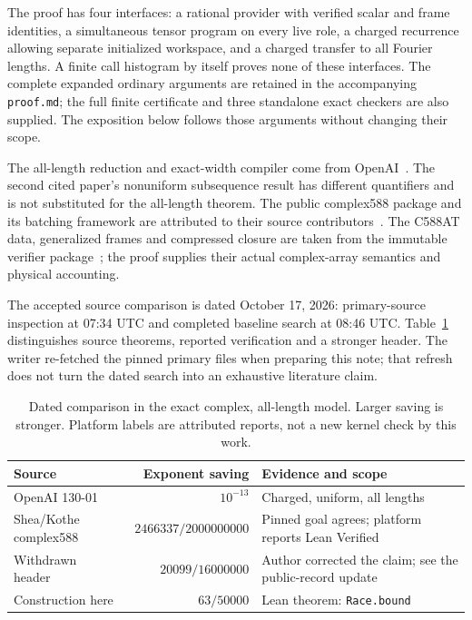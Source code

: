 \documentclass[11pt]{amsart}
\theoremstyle{remark}
\begin{document}
The proof has four interfaces: a rational provider with verified scalar
and frame identities, a simultaneous tensor program on every live role,
a charged recurrence allowing separate initialized workspace, and a
charged transfer to all Fourier lengths. A finite call histogram by
itself proves none of these interfaces. The complete expanded ordinary
arguments are retained in the accompanying \texttt{proof.md}; the full
finite certificate and three standalone exact checkers are also supplied.
The exposition below follows those arguments without changing their scope.

The all-length reduction and exact-width compiler come from
OpenAI~\cite{OpenAIExactDFT2026,OpenAIFiniteTensor2026}. The second cited
paper's nonuniform subsequence result has different quantifiers and is
not substituted for the all-length theorem. The public complex588
package and its batching framework are attributed to their source
contributors~\cite{SheaPackage2026}. The C588AT data, generalized frames
and compressed closure are taken from the immutable verifier
package~\cite{VerifierPackage2026}; the proof supplies their actual
complex-array semantics and physical accounting.

The accepted source comparison is dated October 17, 2026: primary-source
inspection at 07:34 UTC and completed baseline search at 08:46 UTC.
Table~\ref{tab:comparison} distinguishes source theorems, reported
verification and a stronger header. The writer re-fetched the pinned
primary files when preparing this note; that refresh does not turn the
dated search into an exhaustive literature claim.
\begin{table}[ht]
\centering\small
\begin{tabular}{p{}rp{}}
\toprule
Source & Exponent saving & Evidence and scope \\
\midrule
OpenAI 130-01~\cite{OpenAIExactDFT2026} & $10^{-13}$ & Charged, uniform, all lengths \\
Shea/Kothe complex588~\cite{SheaPackage2026} & $2466337/2000000000$ & Pinned goal agrees; platform reports Lean Verified \\
Withdrawn header~\cite{VerifierPackage2026} & $20099/16000000$ & Author corrected the claim; see the public-record update \\
Construction here & $63/50000$ & Lean theorem: \texttt{Race.bound} \\
\bottomrule
\end{tabular}
\caption{Dated comparison in the exact complex, all-length model. Larger
saving is stronger. Platform labels are attributed reports, not a new
kernel check by this work.}\label{tab:comparison}
\end{table}
\end{document}
